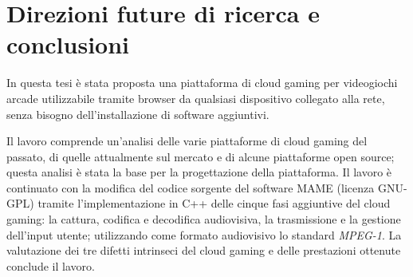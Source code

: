 %
%

\chapter*{Direzioni future di ricerca e conclusioni}


In questa tesi è stata proposta una piattaforma di cloud gaming per videogiochi arcade utilizzabile tramite browser da qualsiasi dispositivo collegato alla rete, senza bisogno dell'installazione di software aggiuntivi.

Il lavoro comprende un'analisi delle varie piattaforme di cloud gaming del passato, di quelle attualmente sul mercato e di alcune piattaforme open source; questa analisi è stata la base per la progettazione della piattaforma. Il lavoro è continuato con la modifica del codice sorgente del software MAME (licenza GNU-GPL) tramite l'implementazione in C++ delle cinque fasi aggiuntive del cloud gaming: la cattura, codifica e decodifica audiovisiva, la trasmissione e la gestione dell'input utente; utilizzando come formato audiovisivo lo standard \textit{MPEG-1}. La valutazione dei tre difetti intrinseci del cloud gaming e delle prestazioni ottenute conclude il lavoro.


